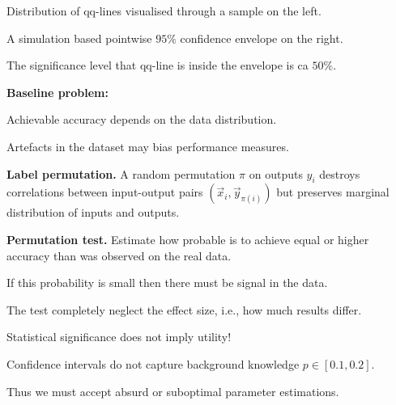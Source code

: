 \documentclass[landscape,footrule]{foils}
\begin{document}
\begin{triangles}
\item Distribution of qq-lines visualised through a sample on the left.
\item A simulation based pointwise $95\%$ confidence envelope on the right.
\item The significance level that qq-line is inside the envelope is ca $50\%$.
\end{triangles}


\textbf{Baseline problem:}
\begin{triangles}
\item Achievable accuracy depends on the data distribution. 
\item Artefacts in the dataset may bias performance measures.
\end{triangles}
\vspace*{2ex}

\textbf{Label permutation.}
A random permutation $\pi$ on outputs $y_i$ destroys correlations between input-output pairs $(\vec{x}_{i}, \vec{y}_{\pi(i)})$ but preserves marginal distribution of inputs and outputs. 
\vspace*{2ex}


\textbf{Permutation test.}
Estimate how probable is to achieve equal or higher accuracy than was observed on the real data.
\begin{triangles}
\item If this probability is small then there must be signal in the data. 
\item The test completely neglect the effect size, i.e., how much results differ.
\item Statistical significance does not imply utility!      
\end{triangles}  







\begin{triangles}
\item Confidence intervals do not capture background knowledge $p\in[0.1,0.2]$. 
\item Thus we must accept absurd or suboptimal parameter estimations. 
\end{triangles}
\end{document}
